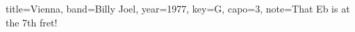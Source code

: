 \documentclass{skrul-leadsheet}
\begin{document}
\begin{song}[transpose-capo=true]{title={Vienna}, band={Billy Joel}, year={1977}, key={G}, capo={3}, note={That Eb is at the 7th fret!}}




\end{song}
\end{document}
